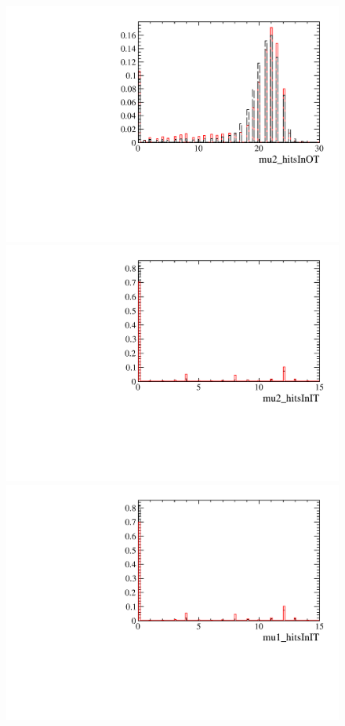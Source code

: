 \begin{figure} [htb!]
\begin{center}
\includegraphics[scale=0.20]{figs/mu2_hitsInOTPARTIAL2pipi.pdf}
\includegraphics[scale=0.20]{figs/mu2_hitsInITPARTIAL2pipi.pdf}
\includegraphics[scale=0.20]{figs/mu1_hitsInITPARTIAL2pipi.pdf}

\end{center}
\end{figure}
